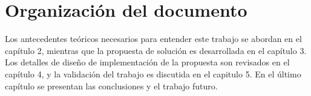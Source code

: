 \begin{intro}
\begin{itemize}
	\end{itemize}

	\section{Organización del documento}

	Los antecedentes teóricos necesarios para entender este trabajo se abordan en el capítulo 2, mientras que la propuesta de solución es desarrollada en el capítulo 3. Los detalles de diseño de implementación de la propuesta son revisados en el capítulo 4, y la validación del trabajo es discutida en el capitulo 5. En el último capítulo se presentan las conclusiones y el trabajo futuro.

\end{intro}
